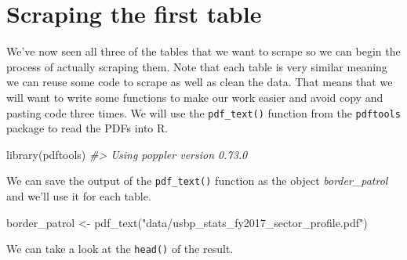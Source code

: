 \documentclass[
  12pt,
]{book}
\newenvironment{Shaded}{\begin{snugshade}}{\end{snugshade}}
\newcommand{\CommentTok}[1]{\textcolor[rgb]{0.37,0.37,0.37}{\textit{#1}}}
\newcommand{\FunctionTok}[1]{\textcolor[rgb]{0,0,0}{#1}}
\newcommand{\NormalTok}[1]{#1}
\newcommand{\OtherTok}[1]{\textcolor[rgb]{0.37,0.37,0.37}{#1}}
\newcommand{\StringTok}[1]{\textcolor[rgb]{0.5,0.5,0.5}{#1}}
\begin{document}
\hypertarget{scraping-the-first-table}{%
\section{Scraping the first table}\label{scraping-the-first-table}}

We've now seen all three of the tables that we want to scrape so we can begin the process of actually scraping them. Note that each table is very similar meaning we can reuse some code to scrape as well as clean the data. That means that we will want to write some functions to make our work easier and avoid copy and pasting code three times. We will use the \texttt{pdf\_text()} function from the \texttt{pdftools} package to read the PDFs into R.

\begin{Shaded}
\begin{Highlighting}[]
\FunctionTok{library}\NormalTok{(pdftools)}
\CommentTok{\#\textgreater{} Using poppler version 0.73.0}
\end{Highlighting}
\end{Shaded}

We can save the output of the \texttt{pdf\_text()} function as the object \emph{border\_patrol} and we'll use it for each table.

\begin{Shaded}
\begin{Highlighting}[]
\NormalTok{border\_patrol }\OtherTok{\textless{}{-}} \FunctionTok{pdf\_text}\NormalTok{(}\StringTok{"data/usbp\_stats\_fy2017\_sector\_profile.pdf"}\NormalTok{)}
\end{Highlighting}
\end{Shaded}

We can take a look at the \texttt{head()} of the result.
\end{document}
